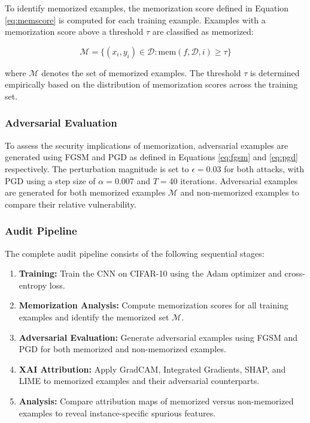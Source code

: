 To identify memorized examples, the memorization 
score defined in Equation \ref{eq:memscore} is 
computed for each training example. Examples with 
a memorization score above a threshold $\tau$ are 
classified as memorized:

\begin{equation}
\mathcal{M} = \{(x_i, y_i) \in \mathcal{D} : 
\text{mem}(f, \mathcal{D}, i) \geq \tau\}
\label{eq:memset}
\end{equation}

where $\mathcal{M}$ denotes the set of memorized 
examples. The threshold $\tau$ is determined 
empirically based on the distribution of 
memorization scores across the training set.

\subsubsection{Adversarial Evaluation}

To assess the security implications of memorization, 
adversarial examples are generated using FGSM and 
PGD as defined in Equations \ref{eq:fgsm} and 
\ref{eq:pgd} respectively. The perturbation 
magnitude is set to $\epsilon = 0.03$ for both 
attacks, with PGD using a step size of 
$\alpha = 0.007$ and $T = 40$ iterations. 
Adversarial examples are generated for both 
memorized examples $\mathcal{M}$ and 
non-memorized examples to compare their 
relative vulnerability.

\subsubsection{Audit Pipeline}

The complete audit pipeline consists of the 
following sequential stages:

\begin{enumerate}
\item \textbf{Training:} Train the CNN on 
CIFAR-10 using the Adam optimizer and 
cross-entropy loss.
\item \textbf{Memorization Analysis:} Compute 
memorization scores for all training examples 
and identify the memorized set $\mathcal{M}$.
\item \textbf{Adversarial Evaluation:} Generate 
adversarial examples using FGSM and PGD for 
both memorized and non-memorized examples.
\item \textbf{XAI Attribution:} Apply GradCAM, 
Integrated Gradients, SHAP, and LIME to 
memorized examples and their adversarial 
counterparts.
\item \textbf{Analysis:} Compare attribution 
maps of memorized versus non-memorized examples 
to reveal instance-specific spurious features.
\end{enumerate}



